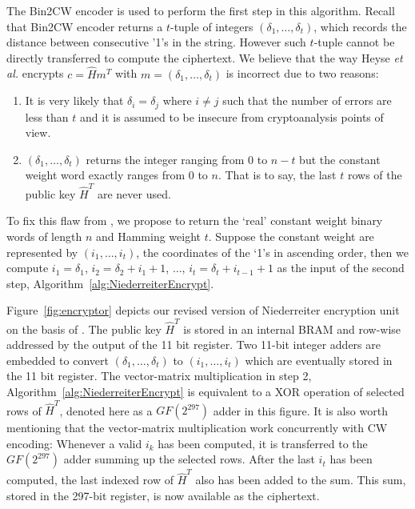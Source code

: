 \documentclass[10pt,journal,compsoc]{IEEEtran}
\begin{document}
The Bin2CW encoder is used to perform the first step in this algorithm. Recall that Bin2CW encoder returns a $t$-tuple of integers
$(\delta_1,\ldots,\delta_t)$, which records the distance between consecutive '1's in the string. However such $t$-tuple cannot
be directly transferred to compute the ciphertext. We believe that the way Heyse \textit{et al.}\cite{heyse2012towards} encrypts $c = {\hat H}m^T$ with
$m=(\delta_1,\ldots,\delta_t)$  is incorrect due to two reasons:
\begin{enumerate}
\item It is very likely that $\delta_i = \delta_j$ where $i\neq j$ such that the number of errors are less than $t$ and
it is assumed to be insecure from cryptoanalysis points of view.
\item $(\delta_1,\ldots,\delta_t)$ returns the integer ranging from $0$ to $n-t$ but the constant weight word
exactly ranges from $0$ to $n$. That is to say, the last $t$ rows of the public key $\hat{H}^T$ are never used.
\end{enumerate}

To fix this flaw from \cite{heyse2012towards}, we propose to return the `real' constant weight binary words of length $n$
and Hamming weight $t$. Suppose the constant weight are represented by $(i_1,\ldots,i_t)$, the coordinates of the `1's in ascending
order, then we compute $i_1=\delta_1$, $i_2=\delta_2+i_1+1$, $\ldots$, $i_t=\delta_t+i_{t-1}+1$ as the input of the second step, Algorithm~\ref{alg:NiederreiterEncrypt}.



Figure~\ref{fig:encryptor} depicts our revised version of Niederreiter encryption unit on the basis of \cite{heyse2012towards}.
The public key $\hat{H}^T$ is stored in an internal BRAM and row-wise addressed by the output of the 11 bit register. Two 11-bit
integer adders are embedded to convert $(\delta_1,\ldots,\delta_t)$ to $(i_1,\ldots,i_t)$ which are eventually stored in the 11 bit register.
The vector-matrix multiplication in step 2, Algorithm~\ref{alg:NiederreiterEncrypt} is equivalent to a XOR operation of selected rows
of $\hat{H}^T$, denoted here as a $GF(2^{297})$ adder in this figure. It is also worth mentioning that the vector-matrix multiplication
work concurrently with CW encoding: Whenever a valid $i_k$ has been computed, it is  transferred to the $GF(2^{297})$ adder
summing up the selected rows. After the last $i_t$ has been computed, the last indexed row of $\hat{H}^T$ also has been added to the sum.
This sum, stored in the 297-bit register, is now available as the ciphertext.
\end{document}
